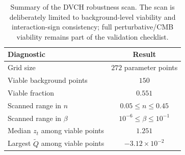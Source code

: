 \documentclass[pdflatex,sn-mathphys-num]{sn-jnl}%
\begin{document}
\begin{table}[t]
\centering
\caption{Summary of the DVCH robustness scan. The scan is deliberately limited
to background-level viability and interaction-sign consistency; full
perturbative/CMB viability remains part of the validation checklist.}
\label{tab:dvch_robustness_scan}
\begin{tabular}{lc}
\toprule
Diagnostic & Result \\
\midrule
Grid size & $272$ parameter points \\
Viable background points & $150$ \\
Viable fraction & $0.551$ \\
Scanned range in $n$ & $0.05\le n\le0.45$ \\
Scanned range in $\beta$ & $10^{-6}\le\beta\le10^{-1}$ \\
Median $z_t$ among viable points & $1.251$ \\
Largest $\widetilde Q$ among viable points & $-3.12\times10^{-2}$ \\
\bottomrule
\end{tabular}
\end{table}
\end{document}
